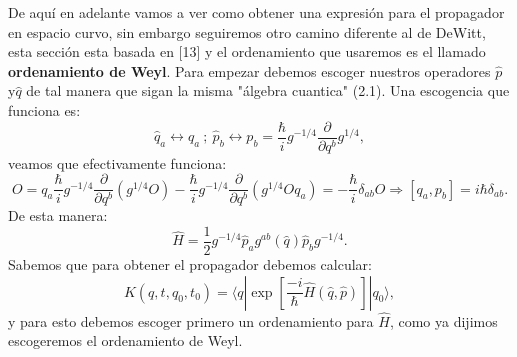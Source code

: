 De aquí en adelante vamos a ver como obtener una expresión para el propagador en espacio curvo, sin embargo seguiremos otro camino diferente al de DeWitt, esta sección esta basada en [13] y el ordenamiento que usaremos es el llamado \textbf{ordenamiento de Weyl}. Para empezar debemos escoger nuestros operadores $\hat{p}$ y$\hat{q}$ de tal manera que sigan la misma "álgebra cuantica" (2.1). Una escogencia que funciona es:
\begin{equation}
\hat{q}_{a}\leftrightarrow q_{a}\ ;\ \hat{p}_{b}\leftrightarrow p_{b}=\frac{\hbar}{i}g^{-1/4}\frac{\partial}{\partial q^{b}}g^{1/4},
\end{equation}
veamos que efectivamente funciona:
\begin{equation}
[q_{a},p_{b}]O=q_{a}\frac{\hbar}{i}g^{-1/4}\frac{\partial}{\partial q^{b}}(g^{1/4}O)-\frac{\hbar}{i}g^{-1/4}\frac{\partial}{\partial q^{b}}(g^{1/4}Oq_{a})=-\frac{\hbar}{i}\delta_{ab}O\Rightarrow[q_{a},p_{b}]=i\hbar\delta_{ab}.
\end{equation}
De esta manera:
\begin{equation}
\hat{H}=\frac{1}{2}g^{-1/4}\hat{p}_{a}g^{ab}(\hat{q})\hat{p}_{b}g^{-1/4}.
\end{equation}
Sabemos que para obtener el propagador debemos calcular:
\begin{equation}
K(q,t,q_{0},t_{0})=\langle q|\exp\left[\frac{-i}{\hbar}\hat{H}(\hat{q},\hat{p})\right]|q_{0}\rangle,
\end{equation}
y para esto debemos escoger primero un ordenamiento para $\hat{H}$, como ya dijimos escogeremos el ordenamiento de Weyl.

